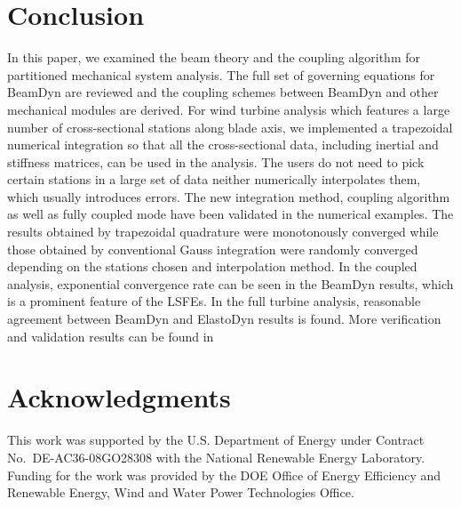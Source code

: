 \documentclass{aiaa-tc}
\begin{document}
\section{Conclusion}
In this paper, we examined the beam theory and the coupling algorithm for partitioned mechanical system analysis. The full set of governing equations for BeamDyn are reviewed and the coupling schemes between BeamDyn and other mechanical modules are derived. For wind turbine analysis which features a large number of cross-sectional stations along blade axis, we implemented a trapezoidal numerical integration so that all the cross-sectional data, including inertial and stiffness matrices, can be used in the analysis. The users do not need to pick certain stations in a large set of data neither numerically interpolates them, which usually introduces errors. The new integration method, coupling algorithm as well as fully coupled mode have been validated in the numerical examples. The results obtained by trapezoidal quadrature were monotonously converged while those obtained by conventional Gauss integration were randomly converged depending on the stations chosen and interpolation method. In the coupled analysis, exponential convergence rate can be seen in the BeamDyn results, which is a prominent feature of the LSFEs. In the full turbine analysis, reasonable agreement between BeamDyn and ElastoDyn results is found. More verification and validation results can be found in 
  
\section*{Acknowledgments} 

This work was supported by the U.S. Department of Energy under Contract No.\
DE-AC36-08GO28308 with the National Renewable Energy Laboratory. Funding for the work was provided by the DOE Office of Energy Efficiency and Renewable Energy, Wind and Water Power Technologies Office.   



\end{document}
